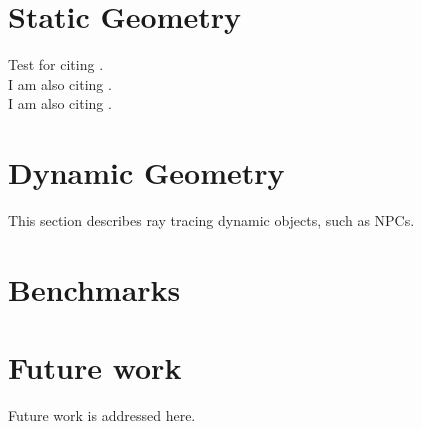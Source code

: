 \documentclass[]{scrartcl}
\begin{document}
\section{Static Geometry}
Test for citing \cite{amanatides1987fast}.
\\
I am also citing \cite{ivson2009gpu}.
\\
I am also citing \cite{reinhard2000dynamic}.

\section{Dynamic Geometry}
This section describes ray tracing dynamic objects, such as NPCs.

\section{Benchmarks}


\section{Future work}
Future work is addressed here.

{}

\end{document}
